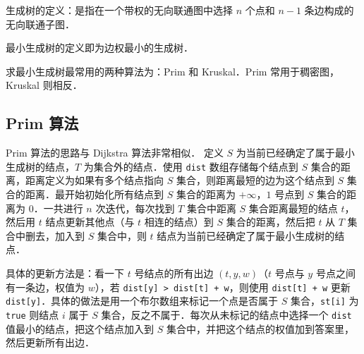 
\begin{issues}
\issueMissDepend
\end{issues}

生成树的定义：是指在一个带权的无向联通图中选择 $n$ 个点和 $n - 1$ 条边构成的无向联通子图．

最小生成树的定义即为边权最小的生成树．

求最小生成树最常用的两种算法为：Prim 和 Kruskal．Prim 常用于稠密图，Kruskal 则相反．

\subsection{Prim 算法}

Prim 算法的思路与 Dijkstra 算法非常相似．
定义 $S$ 为当前已经确定了属于最小生成树的结点，$T$ 为集合外的结点．使用 \verb|dist| 数组存储每个结点到 $S$ 集合的距离，距离定义为如果有多个结点指向 $S$ 集合，则距离最短的边为这个结点到 $S$ 集合的距离．最开始初始化所有结点到 $S$ 集合的距离为 $+\infty$，$1$ 号点到 $S$ 集合的距离为 $0$．一共进行 $n$ 次迭代，每次找到 $T$ 集合中距离 $S$ 集合距离最短的结点 $t$，然后用 $t$ 结点更新其他点（与 $t$ 相连的结点）到 $S$ 集合的距离，然后把 $t$ 从 $T$ 集合中删去，加入到 $S$ 集合中，则 $t$ 结点为当前已经确定了属于最小生成树的结点．

具体的更新方法是：看一下 $t$ 号结点的所有出边 $(t, y, w)$（$t$ 号点与 $y$ 号点之间有一条边，权值为 $w$），若 \verb|dist[y] > dist[t] + w|，则使用 \verb|dist[t] + w| 更新 \verb|dist[y]|．具体的做法是用一个布尔数组来标记一个点是否属于 $S$ 集合，\verb|st[i]| 为 \verb|true| 则结点 $i$ 属于 $S$ 集合，反之不属于．每次从未标记的结点中选择一个 \verb|dist| 值最小的结点，把这个结点加入到 $S$ 集合中，并把这个结点的权值加到答案里，然后更新所有出边．